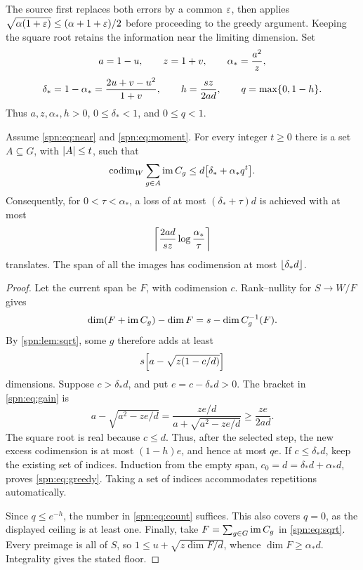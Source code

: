 The source first replaces both errors by a common $\eps$, then applies
$\sqrt{\alpha(1+\eps)}\le(\alpha+1+\eps)/2$ before proceeding to the greedy
argument. Keeping the square root retains the information near the limiting
dimension. Set
\begin{equation}\label{spn:eq:parameters}
\begin{gathered}
 a=1-u,\qquad z=1+v,\qquad \alpha_*=\frac{a^2}{z},\\[3pt]
 \delta_*=1-\alpha_*=\frac{2u+v-u^2}{1+v},\qquad h=\frac{sz}{2ad},\qquad
 q=\max\set{0,1-h}.
\end{gathered}
\end{equation}
Thus $a,z,\alpha_*,h>0$, $0\le\delta_*<1$, and $0\le q<1$.

\begin{theorem}\label{spn:thm:greedy}
Assume \eqref{spn:eq:near} and \eqref{spn:eq:moment}. For every integer $t\ge0$
there is a set $A\subseteq G$, with $\abs{A}\le t$, such that
\begin{equation}\label{spn:eq:greedy}
 \spncodim_W\sum_{g\in A}\spnim C_g\le d\bigl[\delta_*+\alpha_*q^t\bigr].
\end{equation}
Consequently, for $0<\tau<\alpha_*$, a loss of at most $(\delta_*+\tau)d$ is
achieved with at most
\begin{equation}\label{spn:eq:count}
 \ceil*{\frac{2ad}{sz}\log\frac{\alpha_*}{\tau}}
\end{equation}
translates. The span of all the images has codimension at most
$\floor{\delta_*d}$.
\end{theorem}

\begin{proof}
Let the current span be $F$, with codimension $c$. Rank--nullity for
$S\to W/F$ gives
\[
 \dim(F+\spnim C_g)-\dim F=s-\dim C_g^{-1}(F).
\]
By \cref{spn:lem:sqrt}, some $g$ therefore adds at least
\begin{equation}\label{spn:eq:gain}
 s\Bigl[a-\sqrt{z(1-c/d)}\Bigr]
\end{equation}
dimensions. Suppose $c>\delta_*d$, and put $e=c-\delta_*d>0$. The bracket in
\eqref{spn:eq:gain} is
\[
 a-\sqrt{a^2-ze/d}=\frac{ze/d}{a+\sqrt{a^2-ze/d}}\ge\frac{ze}{2ad}.
\]
The square root is real because $c\le d$. Thus, after the selected step, the
new excess codimension is at most $(1-h)e$, and hence at most $qe$. If
$c\le\delta_*d$, keep the existing set of indices. Induction from the empty
span, $c_0=d=\delta_*d+\alpha_*d$, proves \eqref{spn:eq:greedy}. Taking a set of
indices accommodates repetitions automatically.

Since $q\le e^{-h}$, the number in \eqref{spn:eq:count} suffices. This also
covers $q=0$, as the displayed ceiling is at least one. Finally, take
$F=\sum_{g\in G}\spnim C_g$ in \eqref{spn:eq:sqrt}. Every preimage is all of
$S$, so $1\le u+\sqrt{z\dim F/d}$, whence $\dim F\ge\alpha_*d$. Integrality
gives the stated floor.
\end{proof}

